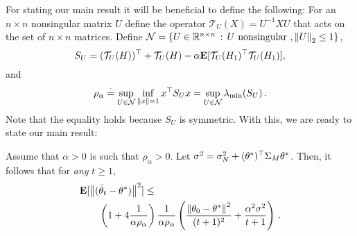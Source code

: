 For stating our main result it will be beneficial to define the following:
\newcommand{\cT}{\mathcal{T}}
\newcommand{\cN}{\mathcal{N}}
For an $n\times n$ nonsingular matrix $U$ define the operator $\cT_{U}(X) = U^{-1} X U$ that acts
on the set of $n\times n$ matrices. 
Define $\cN = \{ U \in \R^{n\times n}\,:\, U \text{ nonsingular }, \norm{U}_2 \le 1 \}$,
\[
S_U = (\cT_U(H))^\top  + \cT_U(H) - \alpha \EE{ \cT_U(H_1)^\top \cT_U(H_1) },
\]
and
\begin{align}
\label{eq:rhodef}
\rho_\alpha
\eqdef \sup_{U\in \cN} \inf_{\norm{x}=1} x^\top S_U x 
=         \sup_{U\in \cN} \lambda_{\min}(S_U)\,.
\end{align}
Note that the equality holds because $S_U$ is symmetric.
With this, we are ready to state our main result:
\begin{theorem}\label{maintheorem}
Assume that $\alpha>0$ is such that $\rho_\alpha>0$. Let $\sigma^2 = \sigma_N^2 + (\theta^*)^\top \Sigma_M \theta^*$.
Then, it follows that for \emph{any} $t\ge 1$, 
\begin{align}
\begin{split}
\MoveEqLeft\E[\norm{(\tb_t-\ts)}^2]\leq \\
&\left(1+4\frac1{\alpha\rho_{\alpha}}\right) \frac{1}{\alpha\rho_{\alpha}}
 \left(\frac{\norm{\theta_0-\ts}^2}{(t+1)^2}+\frac{\alpha^2\sigma^2}{t+1} \right)\,.
\end{split}
\end{align}
\end{theorem}

